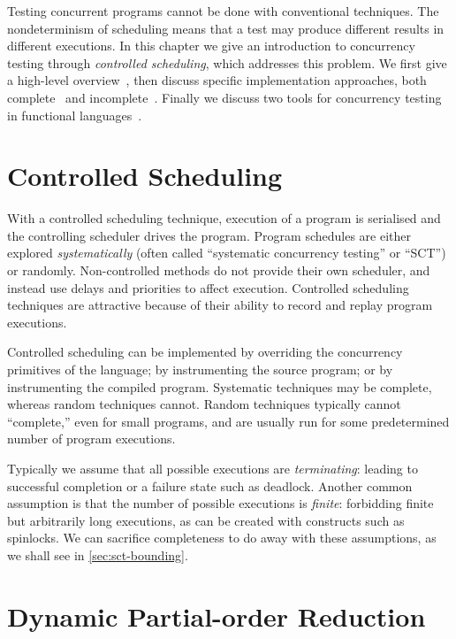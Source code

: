 Testing concurrent programs cannot be done with conventional
techniques.  The nondeterminism of scheduling means that a test may
produce different results in different executions.  In this chapter we
give an introduction to concurrency testing through \emph{controlled
  scheduling}, which addresses this problem.  We first give a
high-level overview~, then discuss specific
implementation approaches, both complete~ and
incomplete~.  Finally we discuss two tools for
concurrency testing in functional languages~.

\section{Controlled Scheduling}
\label{sec:sct-fundamentals}

With a controlled scheduling technique, execution of a program is
serialised and the controlling scheduler drives the program.  Program
schedules are either explored
\emph{systematically}\cite{coons2013,flanagan2005,musuvathi2008,musuvathi2007}
(often called ``systematic concurrency testing'' or ``SCT'') or
randomly\cite{burckhardt2010,thomson2016}.  Non-controlled methods do
not provide their own scheduler, and instead use delays and priorities
to affect execution\cite{yu2012}.  Controlled scheduling techniques
are attractive because of their ability to record and replay program
executions.

Controlled scheduling can be implemented by overriding the concurrency
primitives of the language\cite{walker2015}; by instrumenting the
source program\cite{claessen2009}; or by instrumenting the compiled
program\cite{musuvathi2006,yu2012}.  Systematic techniques may be
complete, whereas random techniques cannot.  Random techniques
typically cannot ``complete,'' even for small programs, and are
usually run for some predetermined number of program executions.

Typically we assume that all possible executions are
\emph{terminating}: leading to successful completion or a failure
state such as deadlock.  Another common assumption is that the number
of possible executions is \emph{finite}: forbidding finite but
arbitrarily long executions, as can be created with constructs such as
spinlocks.  We can sacrifice completeness to do away with these
assumptions, as we shall see in \cref{sec:sct-bounding}.

\section{Dynamic Partial-order Reduction}
\label{sec:sct-dpor}


